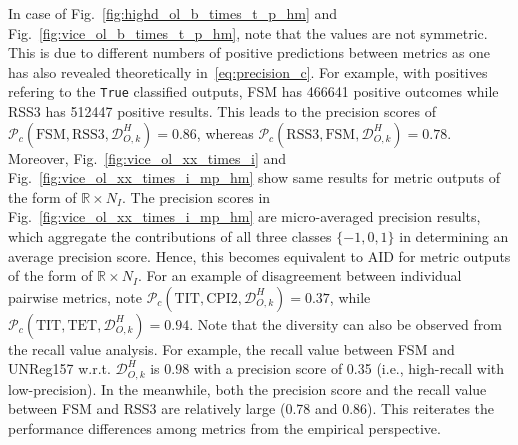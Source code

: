 \documentclass[journal]{IEEEtran}
\begin{document}
In case of Fig.~\ref{fig:highd_ol_b_times_t_p_hm} and Fig.~\ref{fig:vice_ol_b_times_t_p_hm}, note that the values are not symmetric. This is due to different numbers of positive predictions between metrics as one has also revealed theoretically in~\eqref{eq:precision_c}. For example, with positives refering to the \texttt{True} classified outputs, FSM has 466641 positive outcomes while RSS3 has 512447 positive results. This leads to the precision scores of $\mathcal{P}_c(\text{FSM}, \text{RSS3}, \mathcal{D}^H_{O, k}) = 0.86$, whereas $\mathcal{P}_c(\text{RSS3}, \text{FSM}, \mathcal{D}^H_{O, k}) = 0.78$. Moreover, Fig.~\ref{fig:vice_ol_xx_times_i} and Fig.~\ref{fig:vice_ol_xx_times_i_mp_hm} show same results for metric outputs of the form of $\mathbb{R} \times N_I$. The precision scores in Fig.~\ref{fig:vice_ol_xx_times_i_mp_hm} are micro-averaged precision results, which aggregate the contributions of all three classes $\{-1, 0, 1\}$ in determining an average precision score. Hence, this becomes equivalent to AID for metric outputs of the form of $\mathbb{R} \times N_I$. For an example of disagreement between individual pairwise metrics, note $\mathcal{P}_c(\text{TIT}, \text{CPI2}, \mathcal{D}^H_{O, k})=0.37$, while $\mathcal{P}_c(\text{TIT}, \text{TET}, \mathcal{D}^H_{O, k})=0.94$. Note that the diversity can also be observed from the recall value analysis. For example, the recall value between FSM and UNReg157 w.r.t. $\mathcal{D}^H_{O, k}$ is 0.98 with a precision score of 0.35 (i.e., high-recall with low-precision). In the meanwhile, both the precision score and the recall value between FSM and RSS3 are relatively large (0.78 and 0.86). This reiterates the performance differences among metrics from the empirical perspective.
\end{document}
